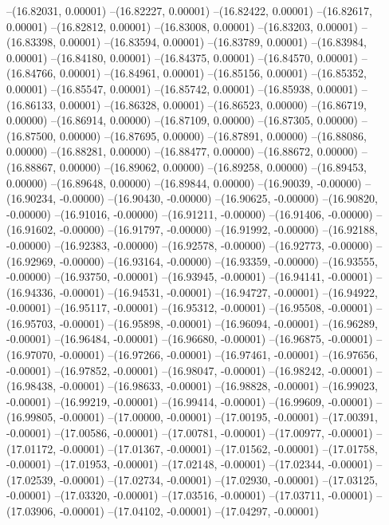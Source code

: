 --(16.82031, 0.00001)
--(16.82227, 0.00001)
--(16.82422, 0.00001)
--(16.82617, 0.00001)
--(16.82812, 0.00001)
--(16.83008, 0.00001)
--(16.83203, 0.00001)
--(16.83398, 0.00001)
--(16.83594, 0.00001)
--(16.83789, 0.00001)
--(16.83984, 0.00001)
--(16.84180, 0.00001)
--(16.84375, 0.00001)
--(16.84570, 0.00001)
--(16.84766, 0.00001)
--(16.84961, 0.00001)
--(16.85156, 0.00001)
--(16.85352, 0.00001)
--(16.85547, 0.00001)
--(16.85742, 0.00001)
--(16.85938, 0.00001)
--(16.86133, 0.00001)
--(16.86328, 0.00001)
--(16.86523, 0.00000)
--(16.86719, 0.00000)
--(16.86914, 0.00000)
--(16.87109, 0.00000)
--(16.87305, 0.00000)
--(16.87500, 0.00000)
--(16.87695, 0.00000)
--(16.87891, 0.00000)
--(16.88086, 0.00000)
--(16.88281, 0.00000)
--(16.88477, 0.00000)
--(16.88672, 0.00000)
--(16.88867, 0.00000)
--(16.89062, 0.00000)
--(16.89258, 0.00000)
--(16.89453, 0.00000)
--(16.89648, 0.00000)
--(16.89844, 0.00000)
--(16.90039, -0.00000)
--(16.90234, -0.00000)
--(16.90430, -0.00000)
--(16.90625, -0.00000)
--(16.90820, -0.00000)
--(16.91016, -0.00000)
--(16.91211, -0.00000)
--(16.91406, -0.00000)
--(16.91602, -0.00000)
--(16.91797, -0.00000)
--(16.91992, -0.00000)
--(16.92188, -0.00000)
--(16.92383, -0.00000)
--(16.92578, -0.00000)
--(16.92773, -0.00000)
--(16.92969, -0.00000)
--(16.93164, -0.00000)
--(16.93359, -0.00000)
--(16.93555, -0.00000)
--(16.93750, -0.00001)
--(16.93945, -0.00001)
--(16.94141, -0.00001)
--(16.94336, -0.00001)
--(16.94531, -0.00001)
--(16.94727, -0.00001)
--(16.94922, -0.00001)
--(16.95117, -0.00001)
--(16.95312, -0.00001)
--(16.95508, -0.00001)
--(16.95703, -0.00001)
--(16.95898, -0.00001)
--(16.96094, -0.00001)
--(16.96289, -0.00001)
--(16.96484, -0.00001)
--(16.96680, -0.00001)
--(16.96875, -0.00001)
--(16.97070, -0.00001)
--(16.97266, -0.00001)
--(16.97461, -0.00001)
--(16.97656, -0.00001)
--(16.97852, -0.00001)
--(16.98047, -0.00001)
--(16.98242, -0.00001)
--(16.98438, -0.00001)
--(16.98633, -0.00001)
--(16.98828, -0.00001)
--(16.99023, -0.00001)
--(16.99219, -0.00001)
--(16.99414, -0.00001)
--(16.99609, -0.00001)
--(16.99805, -0.00001)
--(17.00000, -0.00001)
--(17.00195, -0.00001)
--(17.00391, -0.00001)
--(17.00586, -0.00001)
--(17.00781, -0.00001)
--(17.00977, -0.00001)
--(17.01172, -0.00001)
--(17.01367, -0.00001)
--(17.01562, -0.00001)
--(17.01758, -0.00001)
--(17.01953, -0.00001)
--(17.02148, -0.00001)
--(17.02344, -0.00001)
--(17.02539, -0.00001)
--(17.02734, -0.00001)
--(17.02930, -0.00001)
--(17.03125, -0.00001)
--(17.03320, -0.00001)
--(17.03516, -0.00001)
--(17.03711, -0.00001)
--(17.03906, -0.00001)
--(17.04102, -0.00001)
--(17.04297, -0.00001)
